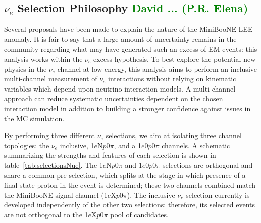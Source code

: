 \documentclass[a4paper]{article}
\begin{document}
\subsection{$\nu_e$ Selection Philosophy \textcolor{green}{David ... (P.R. Elena) }}
\par Several proposals have been made to explain the nature of the MiniBooNE LEE anomaly. It is fair to say that a large amount of uncertainty remains in the community regarding what may have generated such an excess of EM events: this analysis works within the $\nu_e$ excess hypothesis.  To best explore the potential new physics in the $\nu_e$ channel at low energy, this analysis aims to perform an inclusive multi-channel measurement of $\nu_e$ interactions without relying on kinematic variables which depend upon neutrino-interaction models. A multi-channel approach can reduce systematic uncertainties dependent on the chosen interaction model in addition to building a stronger confidence against  issues in the MC simulation.

\par By performing three different $\nu_e$ selections, we aim at isolating three channel topologies: the $\nu_e$ inclusive, 1$e$N$p$0$\pi$, and a 1$e$0$p$0$\pi$ channels. A schematic summarizing the strengths and features of each selection is shown in table~\ref{tab:selectionsNue}. The 1$e$N$p$0$\pi$ and 1$e$0$p$0$\pi$ selections are orthogonal and share a common pre-selection, which splits at the stage in which presence of a final state proton in the event is determined; these two channels combined match the MiniBooNE signal channel (1$e$X$p$0$\pi$). The inclusive $\nu_e$ selection currently is developed independently of the other two selections: therefore, its selected events are not orthogonal to the 1$e$X$p$0$\pi$ pool of candidates.

\end{document}
